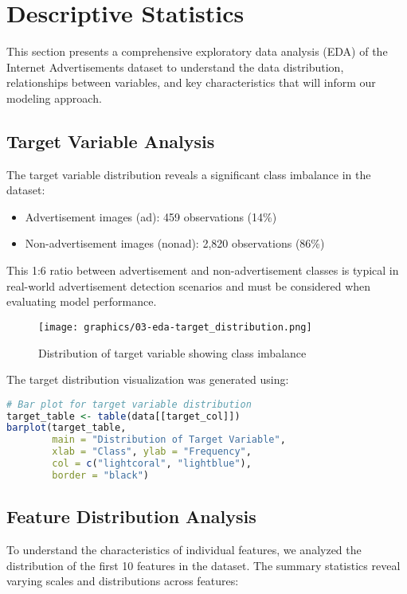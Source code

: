 \section{Descriptive Statistics}
\label{sec:descriptive-statistics}

This section presents a comprehensive exploratory data analysis (EDA) of the Internet Advertisements dataset to understand the data distribution, relationships between variables, and key characteristics that will inform our modeling approach.

\subsection{Target Variable Analysis}
The target variable distribution reveals a significant class imbalance in the dataset:
\begin{itemize}
    \item Advertisement images (ad): 459 observations (14\%)
    \item Non-advertisement images (nonad): 2,820 observations (86\%)
\end{itemize}

This 1:6 ratio between advertisement and non-advertisement classes is typical in real-world advertisement detection scenarios and must be considered when evaluating model performance.

\begin{figure}[H]
\centering
\texttt{[image: graphics/03-eda-target\_distribution.png]}
\caption{Distribution of target variable showing class imbalance}
\label{fig:target-distribution}
\end{figure}

The target distribution visualization was generated using:

\begin{lstlisting}[language=R]
# Bar plot for target variable distribution
target_table <- table(data[[target_col]])
barplot(target_table, 
        main = "Distribution of Target Variable",
        xlab = "Class", ylab = "Frequency",
        col = c("lightcoral", "lightblue"),
        border = "black")
\end{lstlisting}

\subsection{Feature Distribution Analysis}
To understand the characteristics of individual features, we analyzed the distribution of the first 10 features in the dataset. The summary statistics reveal varying scales and distributions across features:

